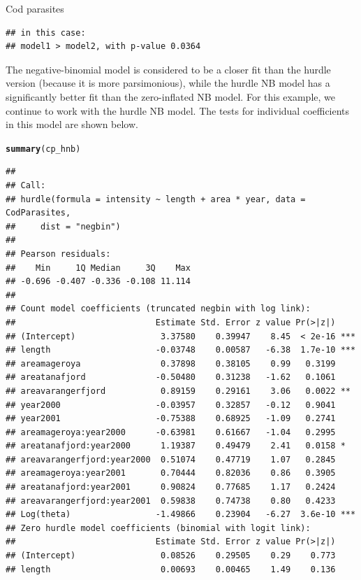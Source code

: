 \documentclass[11pt]{book}\usepackage[]{graphicx}\usepackage[]{color}
\makeatletter
\newcommand{\hlstd}[1]{\textcolor[rgb]{0.345,0.345,0.345}{#1}}%
\newcommand{\hlkwd}[1]{\textcolor[rgb]{0.737,0.353,0.396}{\textbf{#1}}}%
\newenvironment{kframe}{%
 \def\at@end@of@kframe{}%
 \ifinner\ifhmode%
  \def\at@end@of@kframe{\end{minipage}}%
  \begin{minipage}{\columnwidth}%
 \fi\fi%
 \def\FrameCommand##1{\hskip\@totalleftmargin \hskip-\fboxsep
 \colorbox{shadecolor}{##1}\hskip-\fboxsep
     \hskip-\linewidth \hskip-\@totalleftmargin \hskip\columnwidth}%
 \MakeFramed {\advance\hsize-\width
   \@totalleftmargin\z@ \linewidth\hsize
   \@setminipage}}%
 {\par\unskip\endMakeFramed%
 \at@end@of@kframe}
\newenvironment{knitrout}{}{} %
\renewenvironment{knitrout}{\small\renewcommand{\baselinestretch}{.85}}{} %
\makeatother
\begin{document}
\begin{Example}[cod2]{Cod parasites}
\begin{knitrout}
\begin{kframe}
\begin{verbatim}
## in this case:
## model1 > model2, with p-value 0.0364
\end{verbatim}
\end{kframe}
\end{knitrout}
The negative-binomial model is considered to be a closer fit
than the hurdle version (because it is more parsimonious),
while the hurdle NB model has a significantly better fit than the zero-inflated
NB model.  For this example, we continue to work with the hurdle NB model.
The tests for individual coefficients in this model are shown below.
\begin{knitrout}\footnotesize
{}\color{fgcolor}\begin{kframe}
\begin{alltt}
\hlkwd{summary}\hlstd{(cp_hnb)}
\end{alltt}
\begin{verbatim}
## 
## Call:
## hurdle(formula = intensity ~ length + area * year, data = CodParasites, 
##     dist = "negbin")
## 
## Pearson residuals:
##    Min     1Q Median     3Q    Max 
## -0.696 -0.407 -0.336 -0.108 11.114 
## 
## Count model coefficients (truncated negbin with log link):
##                            Estimate Std. Error z value Pr(>|z|)    
## (Intercept)                 3.37580    0.39947    8.45  < 2e-16 ***
## length                     -0.03748    0.00587   -6.38  1.7e-10 ***
## areamageroya                0.37898    0.38105    0.99   0.3199    
## areatanafjord              -0.50480    0.31238   -1.62   0.1061    
## areavarangerfjord           0.89159    0.29161    3.06   0.0022 ** 
## year2000                   -0.03957    0.32857   -0.12   0.9041    
## year2001                   -0.75388    0.68925   -1.09   0.2741    
## areamageroya:year2000      -0.63981    0.61667   -1.04   0.2995    
## areatanafjord:year2000      1.19387    0.49479    2.41   0.0158 *  
## areavarangerfjord:year2000  0.51074    0.47719    1.07   0.2845    
## areamageroya:year2001       0.70444    0.82036    0.86   0.3905    
## areatanafjord:year2001      0.90824    0.77685    1.17   0.2424    
## areavarangerfjord:year2001  0.59838    0.74738    0.80   0.4233    
## Log(theta)                 -1.49866    0.23904   -6.27  3.6e-10 ***
## Zero hurdle model coefficients (binomial with logit link):
##                            Estimate Std. Error z value Pr(>|z|)    
## (Intercept)                 0.08526    0.29505    0.29    0.773    
## length                      0.00693    0.00465    1.49    0.136    

\end{verbatim}
\end{kframe}
\end{knitrout}
\end{Example}
\end{document}
